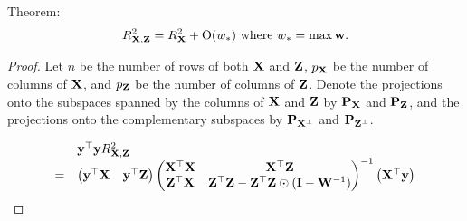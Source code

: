\documentclass{amsart}[12pt]
\newtheorem{theorem}{Theorem}[section]
\begin{document}
Theorem:
\[
	R^2_{{\bf X}, {\bf Z}} = R^2_{{\bf X}} + \text{O}(w_*) \text{ where } w_* = \max{{\bf w}}.
\]

\begin{proof}
	Let $n$ be the number of rows of both ${\bf X}$ and ${\bf Z}$, $p_{\bf X}$ be the number of columns of ${\bf X}$, and $p_{\bf Z}$
	be the number of columns of ${\bf Z}$. Denote the projections onto the subspaces spanned by the columns of ${\bf X}$
	and ${\bf Z}$ by ${\bf P}_{\bf X}$ and ${\bf P}_{\bf Z}$, and the projections onto the complementary subspaces by
	${\bf P}_{{\bf X}^\perp}$ and ${\bf P}_{{\bf Z}^\perp}$.
		
	\small
	\begin{equation*}
		\begin{array}{ll}
			                                                                       & {\bf y}^\top {\bf y} R^2_{{\bf X}, {\bf Z}}                                                                                                                                                                             \\
			=                                                                      &                                                                                                                                                                                                         
			\begin{pmatrix}
			{\bf y}^\top {\bf X}                                                           & {\bf y}^\top {\bf Z}                                                                                                                                                                                            
			\end{pmatrix}
			\begin{pmatrix}
			{\bf X}^\top {\bf X}                                                           & {\bf X}^\top {\bf Z}                                                                                                                                                                                            \\
			{\bf Z}^\top {\bf X}                                                           & {\bf Z}^\top {\bf Z} - {\bf Z}^\top {\bf Z} \odot ({\bf I} - {\bf W}^{-1})                                                                                                                                                      
			\end{pmatrix}^{-1}
			\begin{pmatrix}
			{\bf X}^\top {\bf y}\\

\end{pmatrix}
\end{array}
\end{equation*}
\end{proof}
\end{document}
